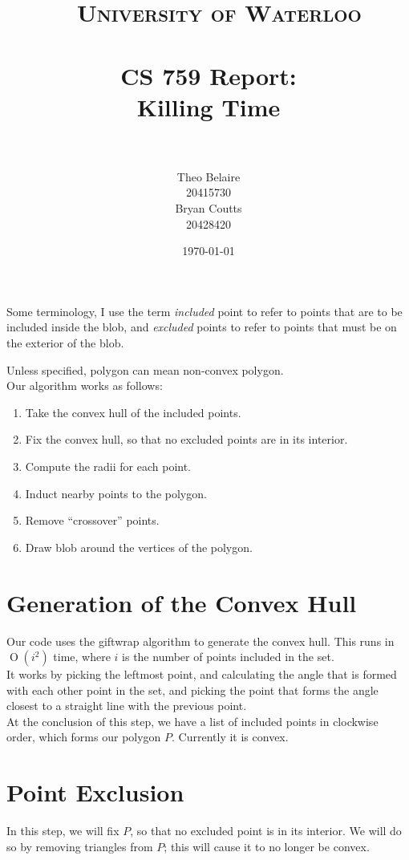 \documentclass[paper=a4, fontsize=11pt]{scrartcl} %
\title{\
    \normalfont\normalsize
    \textsc{University of Waterloo} \\ [25pt] %
    \horrule{0.5pt} \\[0.4cm] %
    \huge CS 759 Report:\\
    Killing Time \\
    \horrule{2pt} \\[0.5cm] %
}
\author{Theo Belaire \\ 20415730 \\ Bryan Coutts \\ 20428420} %
\date{\normalsize\today} %
\numberwithin{equation}{section} %
\numberwithin{figure}{section} %
\numberwithin{table}{section} %
\DeclareMathOperator{\OO}{O}
\begin{document}
\maketitle %


Some terminology, I use the term \textit{included} point to refer to points
that are to be included inside the blob, and \textit{excluded} points to refer
to points that must be on the exterior of the blob.

Unless specified, polygon can mean non-convex polygon. \\

Our algorithm works as follows:
\begin{enumerate}
\item Take the convex hull of the included points.
\item Fix the convex hull, so that no excluded points are in its interior.
\item Compute the radii for each point.
\item Induct nearby points to the polygon. 
\item Remove ``crossover'' points.
\item Draw blob around the vertices of the polygon.
\end{enumerate}


\section{Generation of the Convex Hull}
Our code uses the giftwrap algorithm to generate the convex hull.
This runs in $\OO(i^2)$ time, where $i$ is the number of points included in the
set. \\

It works by picking the leftmost point, and calculating the angle that is
formed with each other point in the set, and picking the point that forms
the angle closest to a straight line with the previous point. \\

At the conclusion of this step, we have a list of included points in clockwise
order, which forms our polygon $P$. Currently it is convex.

\section{Point Exclusion}
In this step, we will fix $P$, so that no excluded point is in its interior. We
will do so by removing triangles from $P$; this will cause it to no longer be
convex. \\
\end{document}
